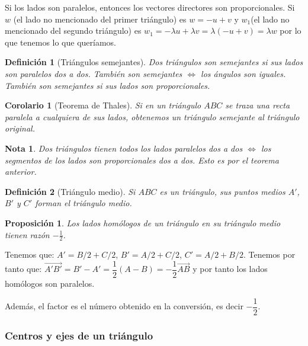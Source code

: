 \documentclass[11pt, a4paper]{article}
\makeatletter
\newif\IfInSansMode
\let\oldsf\sffamily
\renewcommand*{\sffamily}{\oldsf\mathversion{sans}\InSansModetrue}
\let\oldnorm\normalfont
\renewcommand*{\normalfont}{\oldnorm\InSansModefalse\mathversion{normal}}
\renewenvironment{proof}[1][\proofname] {\vspace{-15pt}\par\pushQED{\qed}\normalfont\topsep6\p@\@plus6\p@\relax\trivlist\item[\hskip\labelsep\it#1\@addpunct{.}]\ignorespaces}{\popQED\endtrivlist\@endpefalse}
\renewcommand{\vec}{\overrightarrow}
\renewenvironment{proof}[1][\proofname] {\par\pushQED{\qed}\normalfont\topsep6\p@\@plus6\p@\relax\trivlist\item[\hskip\labelsep\itshape\sffamily#1\@addpunct{.}]\ignorespaces}{\popQED\endtrivlist\@endpefalse}
\theoremstyle{theorem-style}
\newtheorem{nprop}{Proposición}[section]
\newtheorem{ncor}{Corolario}[section]
\theoremstyle{definition-style}
\newtheorem{ndef}{Definición}[section]
\theoremstyle{remark-style}
\newtheorem*{nota}{Nota}
\theoremstyle{example-style}
\makeatother
\begin{document}
  \begin{proof}
    Si los lados son paralelos, entonces los vectores directores son proporcionales.
    Si $w$ (el lado no mencionado del primer triángulo) es $w=-u+v$ y $w_1$(el lado no mencionado del segundo triángulo) es $w_1 = - \lambda u + \lambda v = \lambda (-u+v) = \lambda w$  por lo que tenemos lo que queríamos.
  \end{proof}

\begin{ndef}[Triángulos semejantes]
  Dos triángulos son semejantes si sus lados son paralelos dos a dos. También son semejantes $\iff$ los ángulos son iguales. También son semejantes si sus lados son proporcionales.
\end{ndef}

\begin{ncor}[Teorema de Thales]
  Si en un triángulo $ABC$ se traza una recta paralela a cualquiera de sus lados, obtenemos un triángulo semejante al triángulo original.
\end{ncor}

\begin{nota}
  Dos triángulos tienen todos los lados paralelos dos a dos $\iff$ los segmentos de los lados son proporcionales dos a dos. Esto es por el teorema anterior.
\end{nota}

\begin{ndef}[Triángulo medio]
  Si $ABC$ es un triángulo, sus puntos medios $A'$, $B'$ y $C'$ forman el \textit{triángulo medio}.
\end{ndef}

\begin{nprop}
  Los lados homólogos de un triángulo en su triángulo medio tienen razón $-\frac{1}{2}$.
\end{nprop}

\begin{proof}
  Tenemos que: $A' = B/2 + C/2$, $B' = A/2+C/2$, $C' = A/2 + B/2$. Tenemos por tanto que: $\vec{A'B'} = B'-A' = \dfrac{1}{2}(A-B) = -\dfrac{1}{2} \vec{AB}$ y por tanto los lados homólogos son paralelos.

      Además, el factor es el número obtenido en la conversión, es decir $-\dfrac{1}{2}$.
\end{proof}

\subsubsection{Centros y ejes de un triángulo}
\end{document}
